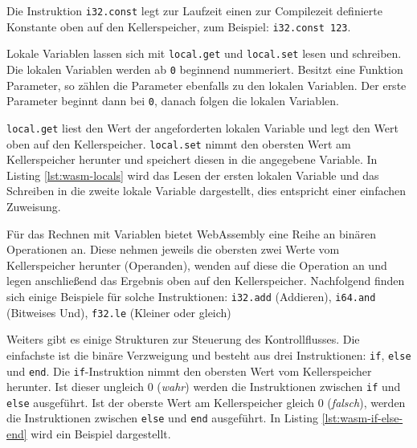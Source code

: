 Die Instruktion \lstinline{i32.const} legt zur Laufzeit einen zur Compilezeit definierte Konstante oben auf den Kellerspeicher, zum Beispiel: \lstinline{i32.const 123}.

Lokale Variablen lassen sich mit \lstinline{local.get} und \lstinline{local.set} lesen und schreiben. Die lokalen Variablen werden ab \lstinline{0} beginnend nummeriert. Besitzt eine Funktion Parameter, so zählen die Parameter ebenfalls zu den lokalen Variablen. Der erste Parameter beginnt dann bei \lstinline{0}, danach folgen die lokalen Variablen.

\lstinline{local.get} liest den Wert der angeforderten lokalen Variable und legt den Wert oben auf den Kellerspeicher. \lstinline{local.set} nimmt den obersten Wert am Kellerspeicher herunter und speichert diesen in die angegebene Variable. In Listing \ref{lst:wasm-locals} wird das Lesen der ersten lokalen Variable und das Schreiben in die zweite lokale Variable dargestellt, dies entspricht einer einfachen Zuweisung. 



Für das Rechnen mit Variablen bietet WebAssembly eine Reihe an binären Operationen an. Diese nehmen jeweils die obersten zwei Werte vom Kellerspeicher herunter (Operanden), wenden auf diese die Operation an und legen anschließend das Ergebnis oben auf den Kellerspeicher. Nachfolgend finden sich einige Beispiele für solche Instruktionen: \lstinline{i32.add} (Addieren), \lstinline{i64.and} (Bitweises Und), \lstinline{f32.le} (Kleiner oder gleich)

Weiters gibt es einige Strukturen zur Steuerung des Kontrollflusses. Die einfachste ist die binäre Verzweigung und besteht aus drei Instruktionen: \lstinline{if}, \lstinline{else} und \lstinline{end}. Die \lstinline{if}-Instruktion nimmt den obersten Wert vom Kellerspeicher herunter. Ist dieser ungleich 0 (\emph{wahr}) werden die Instruktionen zwischen \lstinline{if} und \lstinline{else} ausgeführt. Ist der oberste Wert am Kellerspeicher gleich 0 (\emph{falsch}), werden die Instruktionen zwischen \lstinline{else} und \lstinline{end} ausgeführt. In Listing \ref{lst:wasm-if-else-end} wird ein Beispiel dargestellt.



